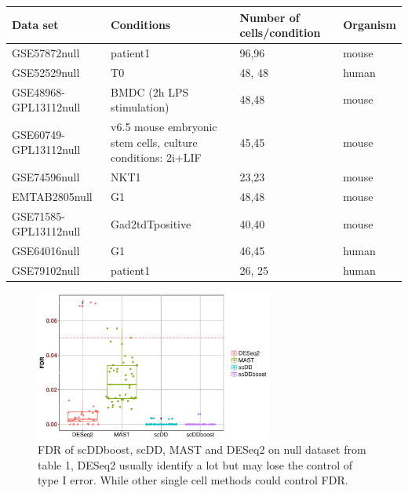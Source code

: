 \documentclass[11pt]{amsart}
\begin{document}
\begin{table}[ht]
\small
\centering
\begin{tabular}{ |p{3cm}|p{5cm}|p{3cm}|p{2cm}|}
\hline
 Data set & Conditions & Number of cells/condition & Organism \\
\hline
\hline
GSE57872null & patient1 & 96,96 & mouse \\
\hline
GSE52529null & T0 & 48, 48 & human \\
\hline
GSE48968-GPL13112null & BMDC (2h LPS stimulation) & 48,48 & mouse \\
\hline
 GSE60749-GPL13112null & v6.5 mouse embryonic stem cells, culture conditions: 2i+LIF & 45,45 & mouse \\
 \hline
 GSE74596null & NKT1 & 23,23 & mouse\\
 \hline
 EMTAB2805null & G1 & 48,48 & mouse\\
 \hline
GSE71585-GPL13112null &Gad2tdTpositive  & 40,40 & mouse \\
\hline
GSE64016null & G1 & 46,45 & human \\
\hline
GSE79102null & patient1 & 26, 25 & human\\
\hline
\end{tabular}
\end{table}


\begin{figure}[H]
\includegraphics[width = 0.7\textwidth]{Figs/fdr.pdf}
 \caption{FDR of scDDboost, scDD, MAST and DESeq2 on null dataset from table 1, DESeq2 usually identify a lot but may lose the control of type I error. While other single cell methods could control FDR. }
  \label{fig:7}
\end{figure}
\end{document}
